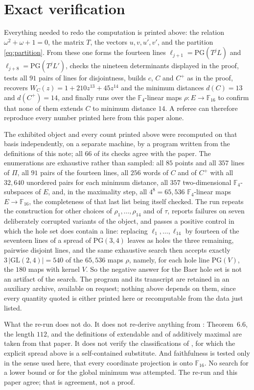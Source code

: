 \documentclass[11pt]{amsart}
\theoremstyle{remark}
\newcommand{\F}{\mathbb F}
\newcommand{\PG}{\mathrm{PG}}
\begin{document}
\section*{Exact verification}

Everything needed to redo the computation is printed above: the relation
$\omega^2+\omega+1=0$, the matrix $T$, the vectors $u,v,u',v'$, and the
partition \eqref{eq:partition}. From these one forms the fourteen lines
$\ell_{j+1}=\PG(T^jL)$ and $\ell_{j+8}=\PG(T^jL')$, checks the nineteen
determinants displayed in the proof, tests all $91$ pairs of lines for
disjointness, builds $c$, $C$ and $C^+$ as in the proof, recovers
$W_C(z)=1+210z^{13}+45z^{14}$ and the minimum distances $d(C)=13$ and
$d(C^+)=14$, and finally runs over the $\F_4$-linear maps
$\rho:E\to\F_{16}$ to confirm that none of them extends $C$ to minimum
distance $14$. A referee can therefore reproduce every number printed here
from this paper alone.

The exhibited object and every count printed above were recomputed on that
basis independently, on a separate machine, by a program written from the
definitions of this note; all $66$ of its checks agree with the paper. The
enumerations are exhaustive rather than sampled: all $85$ points and all
$357$ lines of $\Pi$, all $91$ pairs of the fourteen lines, all $256$ words of $C$ and of $C^+$ with all $32{,}640$
unordered pairs for each minimum distance, all $357$ two-dimensional
$\F_4$-subspaces of $E$, and, in the maximality step, all $4^8=65{,}536$
$\F_4$-linear maps $E\to\F_{16}$, the completeness of that last list being
itself checked. The run repeats the construction for other choices of
$\rho_1,\ldots,\rho_{14}$ and of $\tau$, reports failures on seven
deliberately corrupted variants of the object, and passes a positive control
in which the hole set does contain a line: replacing $\ell_1,\ldots,\ell_{14}$
by fourteen of the seventeen lines of a spread of $\PG(3,4)$ leaves as holes
the three remaining, pairwise disjoint lines, and the same exhaustive search
then accepts exactly $3\,|\mathrm{GL}(2,4)|=540$ of the $65{,}536$ maps
$\rho$, namely, for each hole line $\PG(V)$, the $180$ maps with kernel $V$.
So the negative answer for the Baer hole set is not an artifact of the
search. The program and its transcript are retained in an auxiliary archive,
available on request; nothing above depends on them, since every quantity quoted is either
printed here or recomputable from the data just listed.

What the re-run does not do. It does not re-derive anything from
\cite{Alderson}: Theorem~6.6, the length $112$, and the definitions of
extendable and of additively maximal are taken from that paper. It does not
verify the classifications of \cite{vanDam,Mellinger}, for which the
explicit spread above is a self-contained substitute. And faithfulness is
tested only in the sense used here, that every coordinate projection is onto
$\F_{16}$. No search for a lower bound or for the global minimum was
attempted. The re-run and this paper agree; that is agreement, not a proof.
\end{document}
